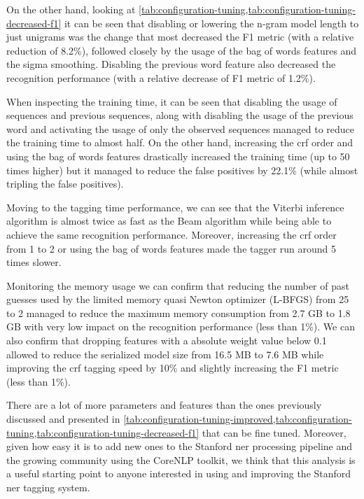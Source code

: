 On the other hand, looking at \cref{tab:configuration-tuning,tab:configuration-tuning-decreased-f1} it can be seen that disabling or lowering the n-gram model length to just unigrams was the change that most decreased the F1 metric (with a relative reduction of 8.2\%), followed closely by the usage of the bag of words features and the sigma smoothing. Disabling the previous word feature also decreased the recognition performance (with a relative decrease of F1 metric of 1.2\%).

When inspecting the training time, it can be seen that disabling the usage of sequences and previous sequences, along with disabling the usage of the previous word and activating the usage of only the observed sequences managed to reduce the training time to almost half. On the other hand, increasing the \gls{crf} order and using the bag of words features drastically increased the training time (up to 50 times higher) but it managed to reduce the false positives by 22.1\% (while almost tripling the false positives).

Moving to the tagging time performance, we can see that the Viterbi inference algorithm is almost twice as fast as the Beam algorithm while being able to achieve the same recognition performance. Moreover, increasing the \gls{crf} order from 1 to 2 or using the bag of words features made the tagger run around 5 times slower.

Monitoring the memory usage we can confirm that reducing the number of past guesses used by the limited memory quasi Newton optimizer (L-BFGS) from 25 to 2 managed to reduce the maximum memory consumption from 2.7 GB to 1.8 GB with very low impact on the recognition performance (less than 1\%). We can also confirm that dropping features with a absolute weight value below 0.1 allowed to reduce the serialized model size from 16.5 MB to 7.6 MB while improving the \gls{crf} tagging speed by 10\% and slightly increasing the F1 metric (less than 1\%).

There are a lot of more parameters and features than the ones previously discussed and presented in \cref{tab:configuration-tuning-improved,tab:configuration-tuning,tab:configuration-tuning-decreased-f1} that can be fine tuned. Moreover, given how easy it is to add new ones to the Stanford \gls{ner} processing pipeline and the growing community using the CoreNLP toolkit, we think that this analysis is a useful starting point to anyone interested in using and improving the Stanford \gls{ner} tagging system.


